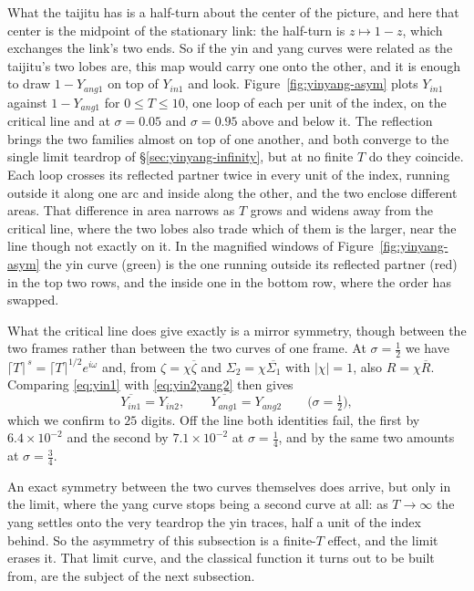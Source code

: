 \documentclass[11pt]{article}
\theoremstyle{definition}
\begin{document}
What the taijitu has is a half-turn about the center of the picture, and here
that center is the midpoint of the stationary link: the half-turn is
$z\mapsto1-z$, which exchanges the link's two ends. So if the yin and yang
curves were related as the taijitu's two lobes are, this map would carry one
onto the other, and it is enough to draw $1-Y_{ang1}$ on top of $Y_{in1}$ and
look.
Figure~\ref{fig:yinyang-asym} plots $Y_{in1}$ against $1-Y_{ang1}$ for
$0\le T\le10$, one loop of each per unit of the index, on the critical line and
at $\sigma=0.05$ and $\sigma=0.95$ above and below it. The
reflection brings the two families almost on top of one another, and both
converge to the single limit teardrop of \S\ref{sec:yinyang-infinity}, but at no
finite $T$ do they coincide. Each loop crosses its reflected partner twice in
every unit of the index, running outside it along one arc and inside along the
other, and the two enclose different areas. That difference in area narrows as
$T$ grows and widens away from the critical line, where the two lobes also trade
which of them is the larger, near the line though not exactly on it. In the
magnified windows of Figure~\ref{fig:yinyang-asym} the yin curve (green) is the
one running outside its reflected partner (red) in the top two rows, and the
inside one in the bottom row, where the order has swapped.

What the critical line
does give exactly is a mirror symmetry, though between the two frames rather
than between the two curves of one frame. At $\sigma=\tfrac12$ we have
$\lceil T\rceil^{\,s}=\lceil T\rceil^{1/2}e^{i\omega}$ and, from
$\zeta=\chi\overline\zeta$ and $\Sigma_2=\chi\overline{\Sigma_1}$ with
$|\chi|=1$, also $R=\chi\overline R$. Comparing \eqref{eq:yin1} with
\eqref{eq:yin2yang2} then gives
\begin{equation}\label{eq:frame-mirror}
\overline{Y_{in1}}=Y_{in2},
\qquad
\overline{Y_{ang1}}=Y_{ang2}
\qquad\bigl(\sigma=\tfrac12\bigr),
\end{equation}
which we confirm to $25$ digits. Off the line both identities fail, the first
by $6.4\times10^{-2}$ and the second by $7.1\times10^{-2}$ at
$\sigma=\tfrac14$, and by the same two amounts at $\sigma=\tfrac34$.

An exact symmetry between the two curves themselves does arrive, but only in the
limit, where the yang curve stops being a second curve at all: as $T\to\infty$
the yang settles onto the very teardrop the yin traces, half a unit of the index
behind. So
the asymmetry of this subsection is a finite-$T$ effect, and the limit erases it.
That limit curve, and the classical function it turns out to be built from, are
the subject of the next subsection.
\end{document}
